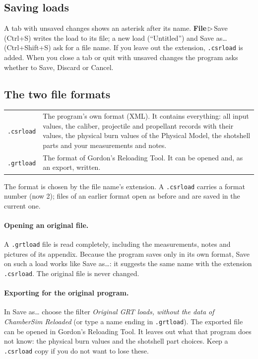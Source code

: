 \documentclass[11pt,a4paper]{article}
\newcommand{\ui}[1]{\textsf{#1}}
\newcommand{\menu}[1]{\textsf{\textbf{#1}}}
\newcommand{\sep}{\,$\triangleright$\,}
\newcommand{\file}[1]{\texttt{#1}}
\begin{document}
\subsection{Saving loads}
A tab with unsaved changes shows an asterisk after its name. \menu{File}\sep\ui{Save} (Ctrl+S) writes the load to its file; a new load (``Untitled'') and
\ui{Save as\dots} (Ctrl+Shift+S) ask for a file name. If you leave out the extension, \file{.csrload} is added.
When you close a tab or quit with unsaved changes the program asks whether to \ui{Save}, \ui{Discard} or \ui{Cancel}.

\subsection{The two file formats}
\begin{center}
\begin{tabular}{@{}lp{10cm}@{}}
  \toprule
  \file{.csrload} & The program's own format (XML). It contains everything: all input values, the caliber, projectile and propellant records
  with their values, the physical burn values of the Physical Model, the shotshell parts and your measurements and notes. \\
  \file{.grtload} & The format of Gordon's Reloading Tool. It can be opened and, as an export, written. \\
  \bottomrule
\end{tabular}
\end{center}
The format is chosen by the file name's extension. A \texttt{.csrload} carries a format number (now 2); files of an earlier format open as before and are saved in the current one.

\paragraph{Opening an original file.} A \file{.grtload} file is read completely, including the measurements, notes and pictures of its appendix. Because the program
saves only in its own format, \ui{Save} on such a load works like \ui{Save as\dots}: it suggests the same name with the extension \file{.csrload}. The original file
is never changed.

\paragraph{Exporting for the original program.} In \ui{Save as\dots} choose the filter \emph{Original GRT loads, without the data of ChamberSim Reloaded}
(or type a name ending in \file{.grtload}). The exported file can be opened in Gordon's Reloading Tool. It leaves out what that program does not know:
the physical burn values and the shotshell part choices. Keep a \file{.csrload} copy if you do not want to lose these.
\end{document}
